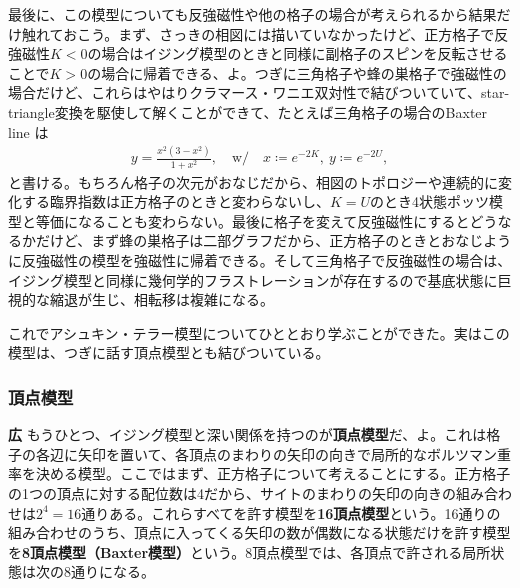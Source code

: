 \documentclass[paper=b5j,fontsize=12Q,jafontsize=12Q,baselineskip=21Q]{jlreq}
\DeclareRobustCommand{\hiron}{\textbf{広 }}
\begin{document}
\begin{refsection}
最後に、この模型についても反強磁性や他の格子の場合が考えられるから結果だけ触れておこう。まず、さっきの相図には描いていなかったけど、正方格子で反強磁性$K<0$の場合はイジング模型のときと同様に副格子のスピンを反転させることで$K>0$の場合に帰着できる、よ。つぎに三角格子や蜂の巣格子で強磁性の場合だけど、これらはやはりクラマース・ワニエ双対性で結びついていて、star-triangle変換を駆使して解くことができて、たとえば三角格子の場合のBaxter line は
\begin{align}
  y = \frac{x^2 (3 - x^2)}{1 + x^2},\quad\mathrm{w/}\quad x\coloneqq e^{-2K},\ y\coloneqq e^{-2U},
\end{align}
と書ける。もちろん格子の次元がおなじだから、相図のトポロジーや連続的に変化する臨界指数は正方格子のときと変わらないし、$K=U$のとき4状態ポッツ模型と等価になることも変わらない。最後に格子を変えて反強磁性にするとどうなるかだけど、まず蜂の巣格子は二部グラフだから、正方格子のときとおなじように反強磁性の模型を強磁性に帰着できる。そして三角格子で反強磁性の場合は、イジング模型と同様に幾何学的フラストレーションが存在するので基底状態に巨視的な縮退が生じ、相転移は複雑になる。

これでアシュキン・テラー模型についてひととおり学ぶことができた。実はこの模型は、つぎに話す頂点模型とも結びついている。

\subsubsection{頂点模型}
\hiron もうひとつ、イジング模型と深い関係を持つのが\textbf{頂点模型}だ、よ。これは格子の各辺に矢印を置いて、各頂点のまわりの矢印の向きで局所的なボルツマン重率を決める模型。ここではまず、正方格子について考えることにする。正方格子の1つの頂点に対する配位数は4だから、サイトのまわりの矢印の向きの組み合わせは$2^4=16$通りある。これらすべてを許す模型を\textbf{16頂点模型}という。16通りの組み合わせのうち、頂点に入ってくる矢印の数が偶数になる状態だけを許す模型を\textbf{8頂点模型（Baxter模型）}という。8頂点模型では、各頂点で許される局所状態は次の8通りになる。

\begin{center}
\end{center}
\end{refsection}
\end{document}
